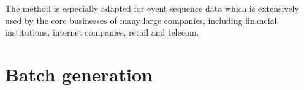 \documentclass{article}
\begin{document}
The method is especially adapted for event sequence data which is extensively used by the core businesses of many large companies, including financial institutions, internet companies, retail and telecom.










\appendix

\section{Batch generation} \label{app-sec-bg}
\end{document}

